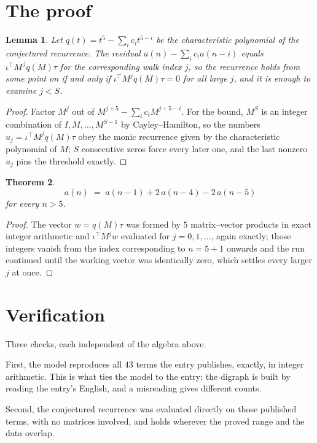 \documentclass[11pt,a4paper]{article}
\theoremstyle{plain}
\newtheorem{theorem}{Theorem}
\newtheorem{lemma}[theorem]{Lemma}
\theoremstyle{definition}
\begin{document}
\section{The proof}

\begin{lemma}\label{lem:crit}
Let $q(t)=t^{5}-\sum_i c_it^{5-i}$ be the characteristic polynomial of the
conjectured recurrence. The residual $a(n)-\sum_ic_ia(n-i)$ equals
$\iota^{\!\top}M^{\,j}q(M)\tau$ for the corresponding walk index $j$, so the recurrence
holds from some point on if and only if $\iota^{\!\top}M^{j}q(M)\tau=0$ for all large $j$,
and it is enough to examine $j<S$.
\end{lemma}

\begin{proof}
Factor $M^{j}$ out of $M^{j+5}-\sum_ic_iM^{j+5-i}$. For the bound, $M^{S}$
is an integer combination of $I,M,\dots,M^{S-1}$ by Cayley--Hamilton, so the numbers
$u_j=\iota^{\!\top}M^{j}q(M)\tau$ obey the monic recurrence given by the characteristic
polynomial of $M$; $S$ consecutive zeros force every later one, and the last nonzero $u_j$
pins the threshold exactly.
\end{proof}

\begin{theorem}
\[
a(n)\;=\;a(n-1) + 2\,a(n-4) - 2\,a(n-5)
\]
for every $n>5$.
\end{theorem}

\begin{proof}
The vector $w=q(M)\tau$ was formed by $5$ matrix--vector products in exact integer
arithmetic and $\iota^{\!\top}M^{j}w$ evaluated for $j=0,1,\dots$, again exactly; those
integers vanish from the index corresponding to $n=5+1$ onwards and the run continued
until the working vector was identically zero, which settles every larger $j$ at once.
\end{proof}

\section{Verification}

Three checks, each independent of the algebra above.

First, the model reproduces all $43$ terms the entry publishes, exactly, in integer
arithmetic. This is what ties the model to the entry: the digraph is built by reading the
entry's English, and a misreading gives different counts.

Second, the conjectured recurrence was evaluated directly on those published terms, with no
matrices involved, and holds wherever the proved range and the data overlap.
\end{document}
